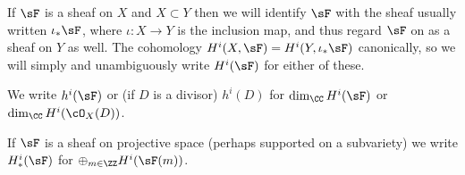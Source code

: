 If $\sF$ is a sheaf on $X$ and $X\subset Y$ then we will identify $\sF$ with
the sheaf usually written $\iota_*\sF$, where $\iota:X\to Y$ is the inclusion map,
 and thus regard $\sF$ on as a sheaf on $Y$ as well.
The cohomology  $H^i(X, \sF) = H^i(Y,\iota_*\sF)$ canonically, so we will
simply and unambiguously write $H^i(\sF)$ for either of these. 

We write $h^i(\sF)$ or (if $D$ is a divisor) $h^{i}(D)$ for 
$\dim_{\CC}H^i(\sF)$ or $\dim_{\CC}H^i(\cO_X(D))$. 

If $\sF$ is a sheaf on projective space (perhaps supported on a subvariety) we write $H^i_*(\sF)$ for
$\oplus_{m\in \ZZ} H^i(\sF(m))$. 




%
%
%




